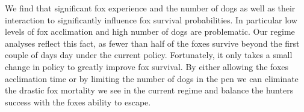 \documentclass[aoas,preprint]{imsart}
\numberwithin{equation}{section}
\theoremstyle{plain}
\begin{document}
We find that significant fox experience and the number of dogs as well as their interaction to significantly influence fox survival probabilities. In particular low levels of fox acclimation and high number of dogs are problematic. Our regime analyses reflect this fact, as fewer than half of the foxes survive beyond the first couple of days day under the current policy. Fortunately, it only takes a small change in policy to greatly improve fox survival. By either allowing the foxes acclimation time or by limiting the number of dogs in the pen we can eliminate the drastic fox mortality we see in the current regime and balance the hunters success with the foxes ability to escape.



%
%
%
\end{document}
